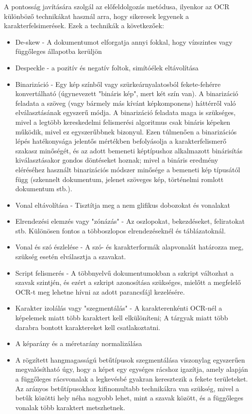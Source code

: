 A pontosság javítására szolgál az előfeldolgozás metódusa, ilyenkor az OCR különböző technikákat használ arra, hogy sikeresek legyenek a karakterfelsimerések. Ezek a technikák a következőek:
\begin{itemize}
	\item De-skew - A dokumentumot elforgatja annyi fokkal, hogy vízszintes vagy függőleges állapotba kerüljön
	
	\item Despeckle - a pozitív és negatív foltok, simítóélek eltávolítása
	
	\item Binarizáció - Egy kép színből vagy szürkeárnyalatosból fekete-fehérre konvertálható (úgynevezett "bináris kép", mert két szín van). A binarizáció feladata a szöveg (vagy bármely
	más kívánt képkomponens) háttérről való elválasztásának egyszerű módja. A binarizáció feladata maga is szükséges, mivel a legtöbb kereskedelmi felismerési algoritmus csak bináris képeken működik, mivel ez egyszerűbbnek bizonyul. Ezen túlmenően a binarizációs lépés hatékonysága jelentős mértékben befolyásolja a karakterfelismerő szakasz minőségét, és az adott bemeneti képtípushoz alkalmazott binárisítás kiválasztásakor gondos döntéseket hoznak; mivel a bináris eredmény eléréséhez használt binarizációs módszer minősége a bemeneti kép típusától függ (szkennelt dokumentum, jelenet szöveges kép, történelmi romlott dokumentum stb.).
	
	\item Vonal eltávolítása - Tisztítja meg a nem glifikus dobozokat és vonalakat
	
	\item Elrendezési elemzés vagy "zónázás" - Az oszlopokat, bekezdéseket, feliratokat stb. Különösen fontos a többoszlopos elrendezéseknél és táblázatoknál.
	
	\item Vonal és szó észlelése - A szó- és karakterformák alapvonalát határozza meg, szükség esetén elválasztja a szavakat.
	
	\item Script felismerés - A többnyelvű dokumentumokban a szkript változhat a szavak szintjén, és ezért a szkript azonosítása szükséges, mielőtt a megfelelő OCR-t meg lehetne hívni az
	adott parancsfájl kezelésére.
	
	\item Karakter izolálás vagy "szegmentálás" - A karakterenkénti OCR-nél a képelemek miatt több karaktert kell elkülöníteni; A tárgyak miatt több darabra bontott karaktereket kell
	csatlakoztatni.
	
	\item A képarány és a méretarány normalizálása
	
	\item A rögzített hangmagasságú betűtípusok szegmentálása viszonylag egyszerűen megvalósítható úgy, hogy a képet egy egységes rácshoz igazítja, amely alapján a függőleges rácsvonalak a legkevésbé gyakran keresztezik a fekete területeket. Az arányos betűtípusokhoz kifinomultabb technikákra van szükség, mivel a betűk közötti hely néha nagyobb lehet, mint a szavak között, és a függőleges vonalak több karaktert metszhetnek.
\end{itemize}

